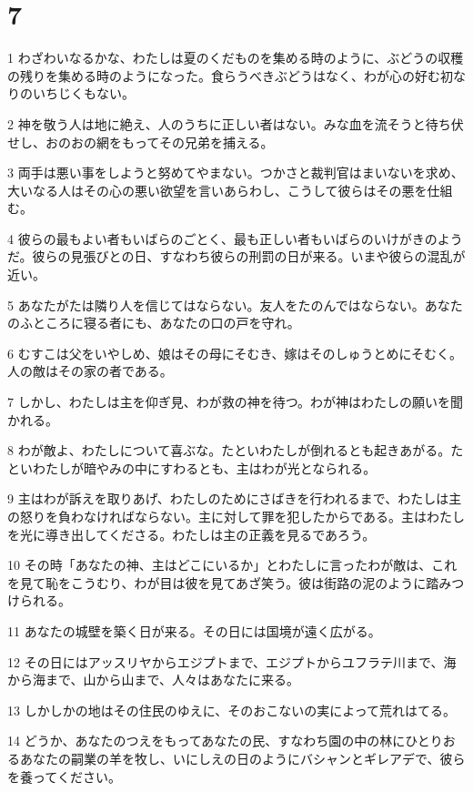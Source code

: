\chapter{7}

\par 1 わざわいなるかな、わたしは夏のくだものを集める時のように、ぶどうの収穫の残りを集める時のようになった。食らうべきぶどうはなく、わが心の好む初なりのいちじくもない。
\par 2 神を敬う人は地に絶え、人のうちに正しい者はない。みな血を流そうと待ち伏せし、おのおの網をもってその兄弟を捕える。
\par 3 両手は悪い事をしようと努めてやまない。つかさと裁判官はまいないを求め、大いなる人はその心の悪い欲望を言いあらわし、こうして彼らはその悪を仕組む。
\par 4 彼らの最もよい者もいばらのごとく、最も正しい者もいばらのいけがきのようだ。彼らの見張びとの日、すなわち彼らの刑罰の日が来る。いまや彼らの混乱が近い。
\par 5 あなたがたは隣り人を信じてはならない。友人をたのんではならない。あなたのふところに寝る者にも、あなたの口の戸を守れ。
\par 6 むすこは父をいやしめ、娘はその母にそむき、嫁はそのしゅうとめにそむく。人の敵はその家の者である。
\par 7 しかし、わたしは主を仰ぎ見、わが救の神を待つ。わが神はわたしの願いを聞かれる。
\par 8 わが敵よ、わたしについて喜ぶな。たといわたしが倒れるとも起きあがる。たといわたしが暗やみの中にすわるとも、主はわが光となられる。
\par 9 主はわが訴えを取りあげ、わたしのためにさばきを行われるまで、わたしは主の怒りを負わなければならない。主に対して罪を犯したからである。主はわたしを光に導き出してくださる。わたしは主の正義を見るであろう。
\par 10 その時「あなたの神、主はどこにいるか」とわたしに言ったわが敵は、これを見て恥をこうむり、わが目は彼を見てあざ笑う。彼は街路の泥のように踏みつけられる。
\par 11 あなたの城壁を築く日が来る。その日には国境が遠く広がる。
\par 12 その日にはアッスリヤからエジプトまで、エジプトからユフラテ川まで、海から海まで、山から山まで、人々はあなたに来る。
\par 13 しかしかの地はその住民のゆえに、そのおこないの実によって荒れはてる。
\par 14 どうか、あなたのつえをもってあなたの民、すなわち園の中の林にひとりおるあなたの嗣業の羊を牧し、いにしえの日のようにバシャンとギレアデで、彼らを養ってください。
